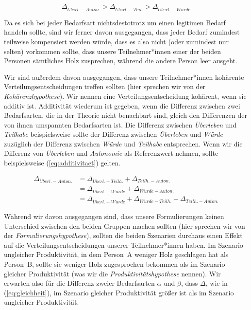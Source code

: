 \documentclass[justified,nobib,nohyper,symmetric,twoside]{tufte-book}
\begin{document}
\begin{equation}\label{eq:hierarchie}
   \Delta_{\ddot{U}berl.-Auton.}>\Delta_{\ddot{U}berl.-Teil.}>\Delta_{\ddot{U}berl.-W\ddot{u}rde}
\end{equation}

Da es sich bei jeder Bedarfsart nichtsdestotrotz um einen legitimen Bedarf handeln sollte, sind wir ferner davon ausgegangen, dass jeder Bedarf zumindest teilweise kompensiert werden würde, dass es also nicht (oder zumindest nur selten) vorkommen sollte, dass unsere Teilnehmer*innen einer der beiden Personen sämtliches Holz zusprechen, während die andere Person leer ausgeht.

Wir sind außerdem davon ausgegangen, dass unsere Teilnehmer*innen kohärente Verteilungsentscheidungen treffen sollten (hier sprechen wir von der \textit{Kohärenz\-hypothese}).
Wir nennen eine Verteilungsentscheidung kohärent, wenn sie additiv ist.
Additivität wiederum ist gegeben, wenn die Differenz zwischen zwei Bedarfsarten, die in der Theorie nicht benachbart sind, gleich den Differenzen der von ihnen umspannten Bedarfsarten ist.
Die Differenz zwischen \textit{Überleben} und \textit{Teilhabe} beispielsweise sollte der Differenz zwischen \textit{Überleben} und \textit{Würde} zuzüglich der Differenz zwischen \textit{Würde} und \textit{Teilhabe} entsprechen.
Wenn wir die Differenz von \textit{Überleben} und \textit{Autonomie} als Referenzwert nehmen, sollte beispielsweise (\ref{eq:additivitaet}) gelten.

\begin{equation}\label{eq:additivitaet}
   \begin{split}
   \Delta_{\ddot{U}berl.-Auton.} & = \Delta_{\ddot{U}berl.-Teilh.} + \Delta_{Teilh.-Auton.} \\
                                 & = \Delta_{\ddot{U}berl.-W\ddot{u}rde} + \Delta_{W\ddot{u}rde-Auton.} \\
                                 & = \Delta_{\ddot{U}berl.-W\ddot{u}rde} + \Delta_{W\ddot{u}rde-Teilh.} + \Delta_{Teilh.-Auton.}
   \end{split}
\end{equation}

Während wir davon ausgegangen sind, dass unsere Formulierungen keinen Unterschied zwischen den beiden Gruppen machen sollten (hier sprechen wir von der \textit{Formulierungshypothese}), sollten die beiden Szenarien durchaus einen Effekt auf die Verteilungsentscheidungen unserer Teilnehmer*innen haben.
Im Szenario ungleicher Produktivität, in dem Person~A weniger Holz geschlagen hat als Person~B, sollte sie weniger Holz zugesprochen bekommen als im Szenario gleicher Produktivität (was wir die \textit{Produktivitätshypothese} nennen).
Wir erwarten also für die Differenz zweier Bedarfsarten $\alpha$ und $\beta$, dass $\Delta$, wie in (\ref{eq:gleichheit}), im Szenario gleicher Produktivität größer ist als im Szenario ungleicher Produktivität.
\end{document}
